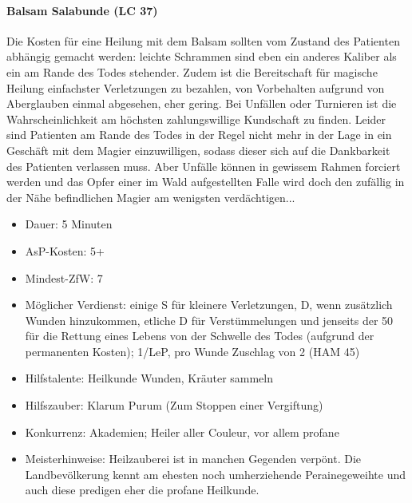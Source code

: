 \paragraph{Balsam Salabunde (LC 37)}
Die Kosten für eine Heilung mit dem Balsam sollten vom Zustand des Patienten abhängig gemacht werden: leichte Schrammen sind eben ein anderes Kaliber als ein am Rande des Todes stehender. Zudem ist die Bereitschaft für magische Heilung einfachster Verletzungen zu bezahlen, von Vorbehalten aufgrund von Aberglauben einmal abgesehen, eher gering. Bei Unfällen oder Turnieren ist die Wahrscheinlichkeit am höchsten zahlungswillige Kundschaft zu finden. Leider sind Patienten am Rande des Todes in der Regel nicht mehr in der Lage in ein Geschäft mit dem Magier einzuwilligen, sodass dieser sich auf die Dankbarkeit des Patienten verlassen muss. Aber Unfälle können in gewissem Rahmen forciert werden und das Opfer einer im Wald aufgestellten Falle wird doch den zufällig in der Nähe befindlichen Magier am wenigsten verdächtigen...
\begin{itemize}
	\item Dauer: 5 Minuten
	\item AsP-Kosten: 5+
	\item Mindest-ZfW: 7
	\item Möglicher Verdienst: einige S für kleinere Verletzungen, D, wenn zusätzlich Wunden hinzukommen, etliche D für Verstümmelungen und jenseits der \SI{50}{\D} für die Rettung eines Lebens von der Schwelle des Todes (aufgrund der permanenten Kosten); \SI{1}{\D}/LeP, pro Wunde Zuschlag von \SI{2}{\D} (HAM 45)
	\item Hilfstalente: Heilkunde Wunden, Kräuter sammeln
	\item Hilfszauber: Klarum Purum (Zum Stoppen einer Vergiftung)
	\item Konkurrenz: Akademien; Heiler aller Couleur, vor allem profane
	\item Meisterhinweise: Heilzauberei ist in manchen Gegenden verpönt. Die Landbevölkerung kennt am ehesten noch umherziehende Perainegeweihte und auch diese predigen eher die profane Heilkunde.
\end{itemize}

